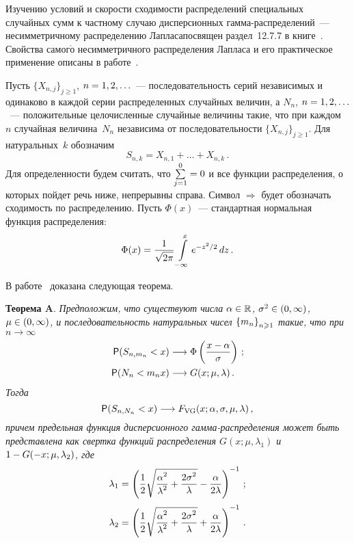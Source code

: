 \begin{multicols}{2}
Изучению условий и скорости сходимости распределений специальных
случайных сумм к част\-ному случаю дисперсионных гам\-ма-рас\-пре\-де\-ле\-ний~--- 
несимметричному распределению Лапласа\linebreak посвя\-щен раздел~12.7.7 в
книге~\cite{KorolevBeningShorgin2011}. Свойства самог$\acute{\mbox{о}}$
несимметричного распределения Лапласа и его практическое применение
описаны в работе~\cite{KotzKozubowskiPodgorski2001}.

Пусть $\{X_{n,j}\}_{j\geqslant1}$, $n\hm=1,2,\ldots$~--- последовательность
серий независимых и одинаково в каждой серии распределенных
случайных величин, а $N_n$, $n\hm=1,2,\ldots$~--- положительные
целочисленные случайные величины такие, что при каждом~$n$ случайная
величина~$N_n$ независима от по\-сле\-до\-ва\-тель\-ности
$\{X_{n,j}\}_{j\geqslant1}$. Для натуральных~$k$ обозначим
$$
S_{n,k}=X_{n,1}+\ldots+X_{n,k}\,.
$$
Для определенности будем считать, что $\sum\limits_{j=1}^0\hm=0$ и все функции
распределения, о которых пойдет речь ниже, непрерывны справа. Символ
$\Longrightarrow$ будет обозначать сходимость по распределению.
Пусть $\Phi(x)$~--- стандартная нормальная функция рас\-пре\-де\-ления:
$$
\Phi(x)=\displaystyle\frac{\displaystyle 1\mathstrut}{\displaystyle \sqrt{2\pi}\mathstrut}\int\limits_{-\infty}^xe^{-z^2/2}\,dz\,.
$$


В работе~\cite{KorolevSokolov2012} доказана следующая теорема.

\smallskip

\noindent
\textbf{Теорема A}. {\it Предположим, что существуют числа $\alpha \hm \in
\mathbb{R}$, $\sigma ^{2} \hm\in (0, \infty )$, $\mu\hm \in(0,\infty)$, и
по\-сле\-до\-ва\-тель\-ность натуральных чисел $\left\{m_n \right\}_{n
\hm\geqslant 1}$ такие, что при $n\to\infty$}
\begin{align}
{\sf P}(S_{n, m_n}<x) &\longrightarrow
\Phi\left(\displaystyle\frac{\displaystyle x-\alpha\mathstrut}{\displaystyle \sigma\mathstrut}\right)\,;\label{e3-ben}
\\
{\sf P}(N_{n}<m_nx) &\longrightarrow G(x;\mu,\lambda)\,.
\label{e4-ben}
\end{align}
\textit{Тогда
$$
{\sf P}(S_{n, N_{n}}<x)\longrightarrow
F_{\mathrm{VG}}(x;\alpha,\sigma,\mu,\lambda)\,,
$$
причем предельная функция дисперсионного гамма-распределения может
быть представлена как свертка функций распределения
$G(x;\mu,\lambda_1)$ и $1\hm-G(-x;\mu,\lambda_2)$, где}
$$
\lambda_1 = \left(\displaystyle\frac{\displaystyle 1\mathstrut}{\displaystyle 2\mathstrut}\sqrt{\displaystyle\frac{\displaystyle \alpha
^{2}\mathstrut}{\displaystyle \lambda^{2}\mathstrut}+\displaystyle\frac{\displaystyle 2\sigma^{2}\mathstrut}{\displaystyle \lambda\mathstrut}} -\displaystyle\frac{\displaystyle  \alpha\mathstrut}{\displaystyle 2\lambda\mathstrut}\right)^{-1}\,;
$$
$$
\lambda_2 =
\left(\displaystyle\frac{\displaystyle 1\mathstrut}{\displaystyle 2\mathstrut}\sqrt{\displaystyle\frac{\displaystyle \alpha^{2}\mathstrut}{\displaystyle \lambda^{2}\mathstrut}+\displaystyle\frac{\displaystyle 2\sigma^{2}\mathstrut}{\displaystyle \lambda\mathstrut}} +\displaystyle\frac{\displaystyle  \alpha\mathstrut}{\displaystyle 2\lambda\mathstrut}\right)^{-1}\,.
$$



\end{multicols}
